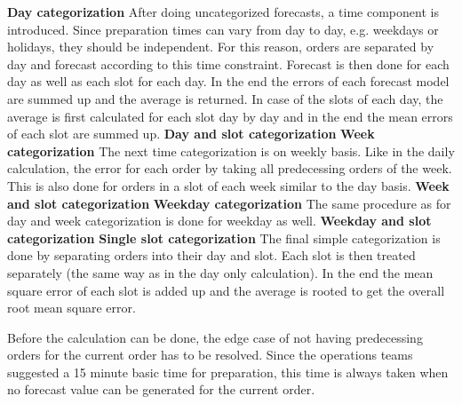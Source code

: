 \newline\newline\textbf{Day categorization}\newline
After doing uncategorized forecasts, a time component is introduced. Since preparation times can vary from day to day, e.g. weekdays or holidays, they should be independent. For this reason, orders are separated by day and forecast according to this time constraint. Forecast is then done for each day as well as each slot for each day. In the end the errors of each forecast model are summed up and the average is returned. In case of the slots of each day, the average is first calculated for each slot day by day and in the end the mean errors of each slot are summed up.
\newline\newline\textbf{Day and slot categorization}\newline
\newline\newline\textbf{Week categorization}\newline
The next time categorization is on weekly basis. Like in the daily calculation, the error for each order by taking all predecessing orders of the week. This is also done for orders in a slot of each week similar to the day basis.
\newline\newline\textbf{Week and slot categorization}\newline
\newline\newline\textbf{Weekday categorization}\newline
The same procedure as for day and week categorization is done for weekday as well.
\newline\newline\textbf{Weekday and slot categorization}\newline
\newline\newline\textbf{Single slot categorization}\newline
The final simple categorization is done by separating orders into their day and slot. Each slot is then treated separately (the same way as in the day only calculation). In the end the mean square error of each slot is added up and the average is rooted to get the overall root mean square error.\newline

Before the calculation can be done, the edge case of not having predecessing orders for the current order has to be resolved. Since the operations teams suggested a 15 minute basic time for preparation, this time is always taken when no forecast value can be generated for the current order.
